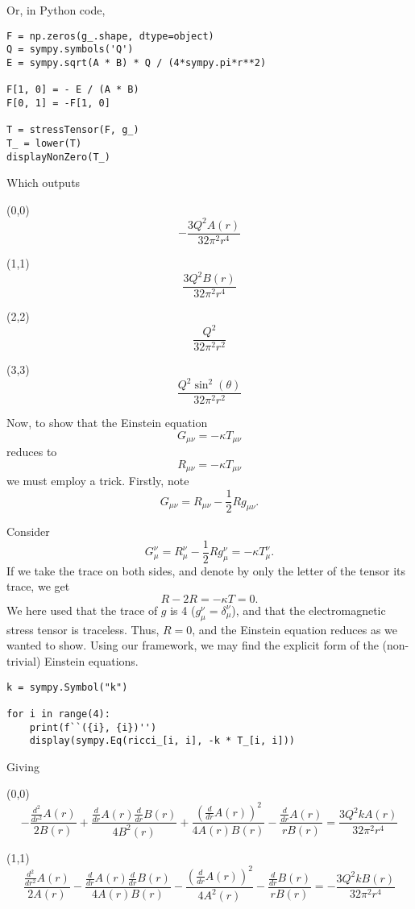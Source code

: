 \documentclass{article}
\begin{document}
Or, in Python code,
\begin{lstlisting}
F = np.zeros(g_.shape, dtype=object)
Q = sympy.symbols('Q')
E = sympy.sqrt(A * B) * Q / (4*sympy.pi*r**2)

F[1, 0] = - E / (A * B)
F[0, 1] = -F[1, 0]

T = stressTensor(F, g_)
T_ = lower(T)
displayNonZero(T_)
\end{lstlisting}
Which outputs

(0,0)
$$
\displaystyle - \frac{3Q^{2} A{\left(r \right)}}{32 \pi^{2} r^{4}}
$$

(1,1)
$$
\displaystyle \frac{3Q^{2} B{\left(r \right)}}{32 \pi^{2} r^{4}}
$$

(2,2)
$$
\displaystyle \frac{Q^{2}}{32 \pi^{2} r^{2}}
$$

(3,3)
$$
\displaystyle \frac{Q^{2} \sin^{2}{\left(\theta \right)}}{32 \pi^{2} r^{2}}
$$

Now, to show that the Einstein equation
$$
G_{\mu \nu} = -\kappa T_{\mu \nu}
$$
reduces to
$$
R_{\mu \nu} = - \kappa T_{\mu \nu}
$$
we must employ a trick.
Firstly, note
$$
G_{\mu \nu} = R_{\mu \nu} - \frac12 R g_{\mu \nu}.
$$

Consider
$$
G_\mu^\nu = R_\mu^\nu - \frac12 R g_\mu^\nu = -\kappa T_\mu^\nu.
$$
If we take the trace on both sides, and denote by only the letter of the tensor its trace, we get
$$
R - 2R = -\kappa T = 0.
$$
We here used that the trace of $g$ is 4 ($g_\mu^\nu = \delta_\mu^\nu$), and that the electromagnetic stress tensor is traceless.
Thus, $R = 0$, and the Einstein equation reduces as we wanted to show.
Using our framework, we may find the explicit form of the (non-trivial) Einstein equations.
\begin{lstlisting}
k = sympy.Symbol("k")

for i in range(4):
    print(f``({i}, {i})'')
    display(sympy.Eq(ricci_[i, i], -k * T_[i, i]))
\end{lstlisting}
Giving 

(0,0)
$$
\displaystyle - \frac{\frac{d^{2}}{d r^{2}} A{\left(r \right)}}{2 B{\left(r \right)}} + \frac{\frac{d}{d r} A{\left(r \right)} \frac{d}{d r} B{\left(r \right)}}{4 B^{2}{\left(r \right)}} + \frac{\left(\frac{d}{d r} A{\left(r \right)}\right)^{2}}{4 A{\left(r \right)} B{\left(r \right)}} - \frac{\frac{d}{d r} A{\left(r \right)}}{r B{\left(r \right)}} = \frac{3Q^{2} k A{\left(r \right)}}{32 \pi^{2} r^{4}}
$$

(1,1)
$$
\displaystyle \frac{\frac{d^{2}}{d r^{2}} A{\left(r \right)}}{2 A{\left(r \right)}} - \frac{\frac{d}{d r} A{\left(r \right)} \frac{d}{d r} B{\left(r \right)}}{4 A{\left(r \right)} B{\left(r \right)}} - \frac{\left(\frac{d}{d r} A{\left(r \right)}\right)^{2}}{4 A^{2}{\left(r \right)}} - \frac{\frac{d}{d r} B{\left(r \right)}}{r B{\left(r \right)}} = - \frac{3Q^{2} k B{\left(r \right)}}{32 \pi^{2} r^{4}}
$$
\end{document}
